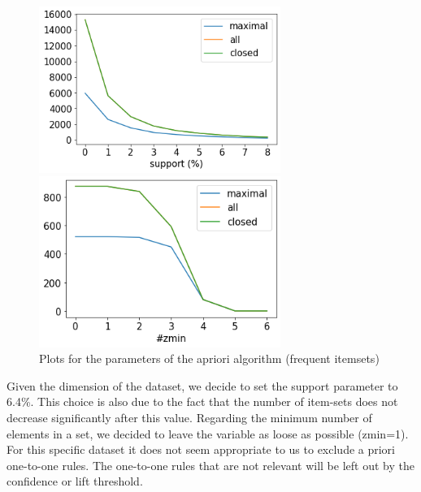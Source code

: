 \documentclass[a4paper,11pt,dvipsnames]{article}
\begin{document}
\begin{figure}[h]
\begin{minipage}{0.51\linewidth}
    \centering
    \includegraphics[width=0.7\textwidth]{support.png}
    \end{minipage}
    \hfil
    \begin{minipage}{0.46\linewidth}
    \centering
    \includegraphics[width=0.7\textwidth]{zmin.png}
    \end{minipage}
    \caption{Plots for the parameters of the apriori algorithm (frequent itemsets)}
    \label{fig:itemset_parameters}
\end{figure}

Given the dimension of the dataset, we decide to set the support parameter to 6.4\%. This choice is also due to the fact that the number of item-sets does not decrease significantly after this value.
Regarding the minimum number of elements in a set, we decided to leave the variable as loose as possible (zmin=1). For this specific dataset it does not seem appropriate to us to exclude a priori one-to-one rules. The one-to-one rules that are not relevant will be left out by the confidence or lift threshold. 
\end{document}
